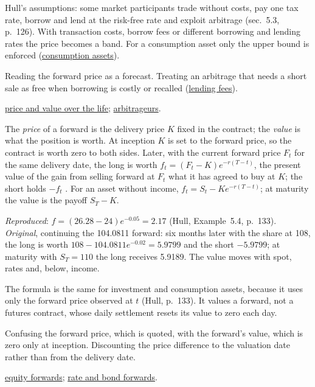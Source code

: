 \begin{qfmethod}
 Hull's assumptions: some market participants trade without costs, pay one tax rate, borrow and lend at the risk-free rate and exploit arbitrage (sec.~5.3, p.~126). With transaction costs, borrow fees or different borrowing and lending rates the price becomes a band. For a consumption asset only the upper bound is enforced (\hyperref[res:cost-of-carry-forward-price]{consumption assets}).

 Reading the forward price as a forecast. Treating an arbitrage that needs a short sale as free when borrowing is costly or recalled (\hyperref[def:securities-lending-fee-rebate]{lending fees}).

 \hyperref[meth:forward-price-value-lifecycle]{price and value over the life}; \hyperref[def:derivative-uses-risks]{arbitrageurs}.

\end{qfmethod}

\begin{qfmethod}\label{meth:forward-price-value-lifecycle}
 The \emph{price} of a forward is the delivery price $K$ fixed in the contract; the \emph{value} is what the position is worth. At inception $K$ is set to the forward price, so the contract is worth zero to both sides. Later, with the current forward price $F_t$ for the same delivery date, the long is worth $f_t=(F_t-K)e^{-r(T-t)}$, the present value of the gain from selling forward at $F_t$ what it has agreed to buy at $K$; the short holds $-f_t$ \citep[chap.~5, sec.~5.7, pp.~133--134]{s7-hulloptions}. For an asset without income, $f_t=S_t-Ke^{-r(T-t)}$; at maturity the value is the payoff $S_T-K$.

 \emph{Reproduced}: $f=(26.28-24)e^{-0.05}=2.17$ (Hull, Example~5.4, p.~133). \emph{Original}, continuing the 104.0811 forward: six months later with the share at 108, the long is worth $108-104.0811e^{-0.02}=5.9799$ and the short $-5.9799$; at maturity with $S_T=110$ the long receives 5.9189. The value moves with spot, rates and, below, income.

 The formula is the same for investment and consumption assets, because it uses only the forward price observed at $t$ (Hull, p.~133). It values a forward, not a futures contract, whose daily settlement resets its value to zero each day.

 Confusing the forward price, which is quoted, with the forward's value, which is zero only at inception. Discounting the price difference to the valuation date rather than from the delivery date.

 \hyperref[meth:equity-forward-futures-valuation]{equity forwards}; \hyperref[meth:rate-bond-forward-valuation]{rate and bond forwards}.

\end{qfmethod}

